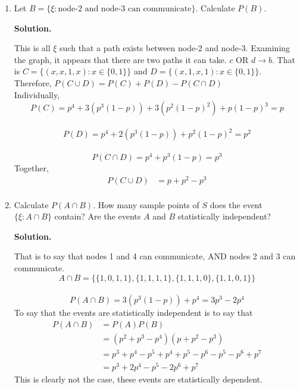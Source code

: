 \documentclass[11pt]{article}
\newenvironment{solution}{\par\noindent\textbf{Solution.}\ }{\par\vspace{6pt}}
\begin{document}
\begin{enumerate}[label=(\alph*)]
    \item Let $B = \{\xi : \text{node-2 and node-3 can communicate}\}$. Calculate $P(B)$.

    \begin{solution}

        This is all $\xi$ such that a path exists between node-2 and node-3.
        Examining the graph, it appears that there are two paths it can take. $c$ OR $d \rightarrow b$.
        That is $C = \{(x, x, 1, x): x \in \{0, 1\}\}$ and $D = \{(x, 1, x, 1): x \in \{0, 1\}\}$.
        Therefore, $P(C \cup D) = P(C) + P(D) - P(C \cap D)$ \\
        Individually,
        \[P(C) = p^4 + 3(p^3(1 - p)) + 3(p^2(1 - p)^2) + p(1-p)^3 = p\] \\
        \[P(D) = p^4 + 2(p^3(1 - p)) + p^2(1-p)^2 = p^2\] \\
        \[P(C \cap D) = p^4 + p^3(1 - p) = p^3\]
        Together,
        \begin{align}
            P(C \cup D) &= p + p^2 - p^3\\
        \end{align}

    \end{solution}

    \item Calculate $P(A \cap B)$. How many sample points of $S$ does the event $\{\xi : A \cap B\}$ contain? Are the events $A$ and $B$ statistically independent?

    \begin{solution}

        That is to say that nodes 1 and 4 can communicate, AND nodes 2 and 3 can communicate.
        \[A \cap B = \big\{\{1, 0, 1, 1\}, \{1, 1, 1, 1\}, \{1, 1, 1, 0\}, \{1, 1, 0, 1\}\big\}\] \\
        \[P(A \cap B) = 3(p^3(1-p)) + p^4 = 3p^3 - 2p^4\]
        To say that the events are statistically independent is to say that
        \begin{align}
            P(A \cap B) &= P(A)P(B)\\
            &= (p^2 + p^3 - p^4)(p + p^2 - p^3) \\
            &= p^3 + p^4 - p^5 + p^4 + p^5 - p^6 - p^5 - p^6 + p^7 \\
            &= p^3 + 2p^4 - p^5 - 2p^6 + p^7
        \end{align}
        This is clearly not the case, these events are statistically dependent.

    \end{solution}


\end{enumerate}
\end{document}

